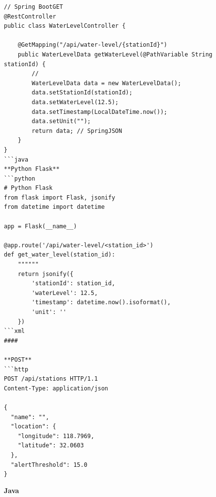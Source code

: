 \begin{verbatim}
// Spring BootGET
@RestController
public class WaterLevelController {
    
    @GetMapping("/api/water-level/{stationId}")
    public WaterLevelData getWaterLevel(@PathVariable String stationId) {
        // 
        WaterLevelData data = new WaterLevelData();
        data.setStationId(stationId);
        data.setWaterLevel(12.5);
        data.setTimestamp(LocalDateTime.now());
        data.setUnit("");
        return data; // SpringJSON
    }
}
```java
**Python Flask**
```python
# Python Flask
from flask import Flask, jsonify
from datetime import datetime

app = Flask(__name__)

@app.route('/api/water-level/<station_id>')
def get_water_level(station_id):
    """"""
    return jsonify({
        'stationId': station_id,
        'waterLevel': 12.5,
        'timestamp': datetime.now().isoformat(),
        'unit': ''
    })
```xml
#### 

**POST**
```http
POST /api/stations HTTP/1.1
Content-Type: application/json

{
  "name": "",
  "location": {
    "longitude": 118.7969,
    "latitude": 32.0603
  },
  "alertThreshold": 15.0
}
\end{verbatim}

\textbf{Java}

